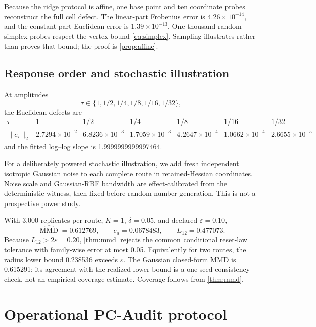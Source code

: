 \documentclass[10pt]{article}
\theoremstyle{definition}
\theoremstyle{remark}
\newcommand{\MMD}{\operatorname{MMD}}
\newcommand{\eps}{\varepsilon}
\begin{document}
Because the ridge protocol is affine, one base point and ten coordinate probes
reconstruct the full cell defect. The linear-part Frobenius error is
\(4.26\times10^{-14}\), and the constant-part Euclidean error is
\(1.39\times10^{-13}\). One thousand random simplex probes respect the vertex
bound \eqref{eq:simplex}. Sampling illustrates rather than proves that bound; the
proof is \cref{prop:affine}.

\subsection{Response order and stochastic illustration}

At amplitudes
\[
\tau\in\{1,1/2,1/4,1/8,1/16,1/32\},
\]
the Euclidean defects are
\[
\begin{array}{c|rrrrrr}
\tau & 1 & 1/2 & 1/4 & 1/8 & 1/16 & 1/32\\
\hline
\|c_\tau\|_2 &
2.7294\!\times\!10^{-2} &
6.8236\!\times\!10^{-3} &
1.7059\!\times\!10^{-3} &
4.2647\!\times\!10^{-4} &
1.0662\!\times\!10^{-4} &
2.6655\!\times\!10^{-5}
\end{array}
\]
and the fitted log--log slope is 1.9999999999997464.

For a deliberately powered stochastic illustration, we add fresh independent
isotropic Gaussian noise to each complete route in retained-Hessian
coordinates. Noise scale and Gaussian-RBF bandwidth are effect-calibrated from
the deterministic witness, then fixed before random-number generation. This
is not a prospective power study.

With 3,000 replicates per route, \(K=1\), \(\delta=0.05\), and declared
\(\eps=0.10\),
\[
\widehat{\MMD}=0.612769,
\qquad
e_a=0.0678483,
\qquad
L_{12}=0.477073.
\]
Because \(L_{12}>2\eps=0.20\), \cref{thm:mmd} rejects the common conditional
reset-law tolerance with family-wise error at most 0.05. Equivalently for two
routes, the radius lower bound 0.238536 exceeds \(\eps\). The Gaussian
closed-form MMD is 0.615291; its
agreement with the realized lower bound is a one-seed consistency check, not
an empirical coverage estimate. Coverage follows from \cref{thm:mmd}.

\section{Operational PC-Audit protocol}
\end{document}
